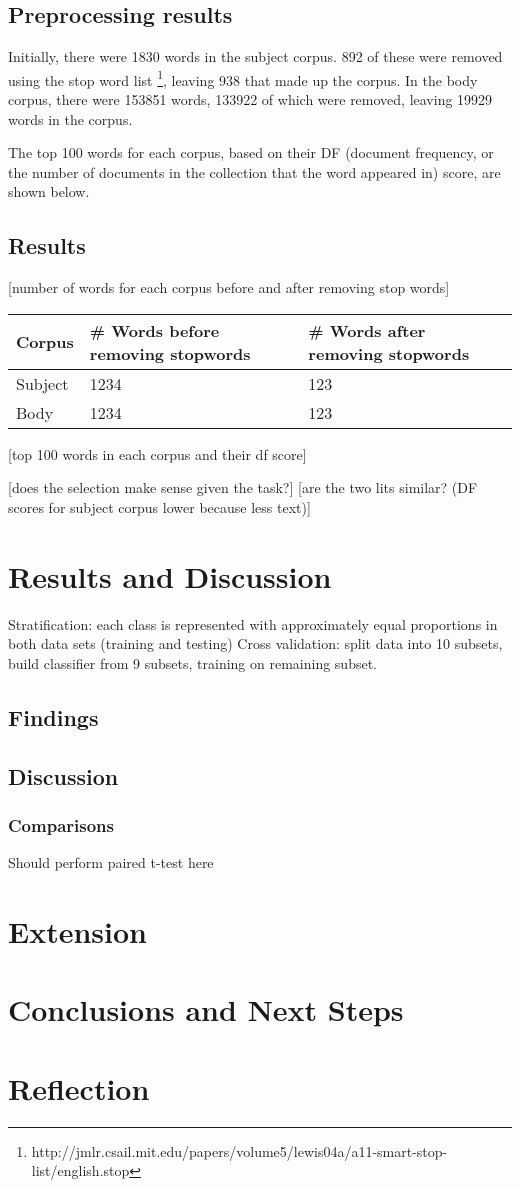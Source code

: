 \documentclass[12pt]{article}
\begin{document}
\subsection{Preprocessing results}
Initially, there were 1830 words in the subject corpus. 892 of these were removed using
the stop word list
\footnote{http://jmlr.csail.mit.edu/papers/volume5/lewis04a/a11-smart-stop-list/english.stop},
leaving 938 that made up the corpus.
In the body corpus, there were 153851 words, 133922 of which were removed, leaving 19929
words in the corpus.

The top 100 words for each corpus, based on their DF (document frequency, or the number
of documents in the collection that the word appeared in) score, are shown below.

\subsection{Results}
[number of words for each corpus before and after removing stop words]
\begin{tabular}{ | l | l | l | }
\hline
Corpus & \# Words before removing stopwords & \# Words after removing stopwords\\ \hline
Subject & 1234 & 123  \\ \hline
Body & 1234 & 123 \\
\hline
\end{tabular}
[top 100 words in each corpus and their df score]

[does the selection make sense given the task?]
[are the two lits similar? (DF scores for subject corpus lower because less text)]

\section{Results and Discussion}
Stratification: each class is represented with approximately equal proportions in both data sets (training and testing)
Cross validation: split data into 10 subsets, build classifier from 9 subsets, training on remaining subset.

\subsection{Findings}
\subsection{Discussion}
\subsubsection{Comparisons}
Should perform paired t-test here
\section{Extension}

\section{Conclusions and Next Steps}

\section{Reflection}



\end{document}
